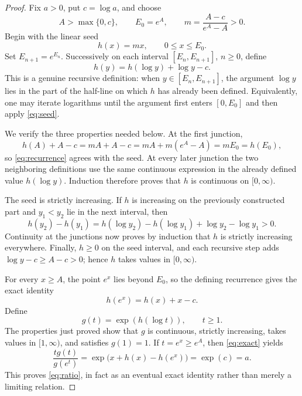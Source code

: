\documentclass[11pt,a4paper]{article}
\begin{document}
\begin{proof}
Fix $a>0$, put $c=\log a$, and choose
\[
 A>\max\{0,c\},\qquad E_0=e^A,
 \qquad m=\frac{A-c}{e^A-A}>0.
\]
Begin with the linear seed
\begin{equation}\label{eq:seed}
 h(x)=mx,\qquad 0\le x\le E_0.
\end{equation}
Set $E_{n+1}=e^{E_n}$.  Successively on each interval
$[E_n,E_{n+1}]$, $n\ge0$, define
\begin{equation}\label{eq:recurrence}
 h(y)=h(\log y)+\log y-c.
\end{equation}
This is a genuine recursive definition: when $y\in[E_n,E_{n+1}]$,
the argument $\log y$ lies in the part of the half-line on which $h$ has
already been defined.  Equivalently, one may iterate logarithms until the
argument first enters $[0,E_0]$ and then apply \eqref{eq:seed}.

We verify the three properties needed below.  At the first junction,
\[
 h(A)+A-c=mA+A-c=mA+m(e^A-A)=mE_0=h(E_0),
\]
so \eqref{eq:recurrence} agrees with the seed.  At every later junction the
two neighboring definitions use the same continuous expression in the
already defined value $h(\log y)$.  Induction therefore proves that $h$ is
continuous on $[0,\infty)$.

The seed is strictly increasing.  If $h$ is increasing on the previously
constructed part and $y_1<y_2$ lie in the next interval, then
\[
 h(y_2)-h(y_1)
 =h(\log y_2)-h(\log y_1)+\log y_2-\log y_1>0.
\]
Continuity at the junctions now proves by induction that $h$ is strictly
increasing everywhere.  Finally, $h\ge0$ on the seed interval, and each
recursive step adds $\log y-c\ge A-c>0$; hence $h$ takes values in
$[0,\infty)$.

For every $x\ge A$, the point $e^x$ lies beyond $E_0$, so the defining
recurrence gives the exact identity
\begin{equation}\label{eq:exact}
 h(e^x)=h(x)+x-c.
\end{equation}
Define
\begin{equation}\label{eq:g}
 g(t)=\exp(h(\log t)),\qquad t\ge1.
\end{equation}
The properties just proved show that $g$ is continuous, strictly increasing,
takes values in $[1,\infty)$, and satisfies $g(1)=1$.  If $t=e^x\ge e^A$,
then \eqref{eq:exact} yields
\[
 \frac{t g(t)}{g(e^t)}
 =\exp\!\bigl(x+h(x)-h(e^x)\bigr)
 =\exp(c)=a.
\]
This proves \eqref{eq:ratio}, in fact as an eventual exact identity rather
than merely a limiting relation.
\end{proof}
\end{document}
